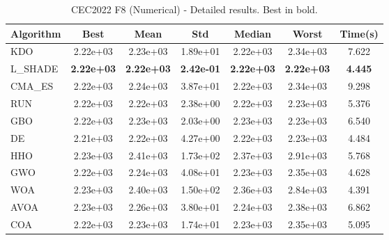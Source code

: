 \begin{table}[H]
\centering\small
\caption{CEC2022 F8 (Numerical) - Detailed results. Best in bold.}
\label{tab:cec2022_F8}
\begin{tabular}{lcccccc}
\toprule
\textbf{Algorithm} & \textbf{Best} & \textbf{Mean} & \textbf{Std} & \textbf{Median} & \textbf{Worst} & \textbf{Time(s)} \\
\midrule
KDO & 2.22e+03 & 2.23e+03 & 1.89e+01 & 2.22e+03 & 2.34e+03 & 7.622 \\
L_SHADE & \textbf{2.22e+03} & \textbf{2.22e+03} & \textbf{2.42e-01} & \textbf{2.22e+03} & \textbf{2.22e+03} & \textbf{4.445} \\
CMA_ES & 2.22e+03 & 2.24e+03 & 3.87e+01 & 2.22e+03 & 2.34e+03 & 9.298 \\
RUN & 2.22e+03 & 2.22e+03 & 2.38e+00 & 2.22e+03 & 2.23e+03 & 5.376 \\
GBO & 2.22e+03 & 2.23e+03 & 2.03e+00 & 2.23e+03 & 2.23e+03 & 6.540 \\
DE & 2.21e+03 & 2.22e+03 & 4.27e+00 & 2.22e+03 & 2.23e+03 & 4.484 \\
HHO & 2.23e+03 & 2.41e+03 & 1.73e+02 & 2.37e+03 & 2.91e+03 & 5.768 \\
GWO & 2.22e+03 & 2.24e+03 & 4.08e+01 & 2.23e+03 & 2.35e+03 & 4.628 \\
WOA & 2.23e+03 & 2.40e+03 & 1.50e+02 & 2.36e+03 & 2.84e+03 & 4.391 \\
AVOA & 2.23e+03 & 2.26e+03 & 3.80e+01 & 2.24e+03 & 2.38e+03 & 6.862 \\
COA & 2.22e+03 & 2.23e+03 & 1.74e+01 & 2.23e+03 & 2.35e+03 & 5.095 \\
\bottomrule
\end{tabular}
\end{table}

